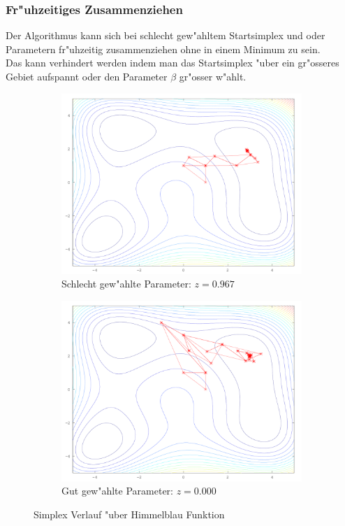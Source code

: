 \subsubsection{Fr"uhzeitiges Zusammenziehen}
\label{sec:downhillZusammenziehen}
Der Algorithmus kann sich bei schlecht gew"ahltem Startsimplex und oder Parametern fr"uhzeitig zusammenziehen ohne in einem Minimum zu sein.\\
Das kann verhindert werden indem man das Startsimplex "uber ein gr"osseres Gebiet aufspannt oder den Parameter $\beta$ gr"osser w"ahlt.


\begin{figure}[htb]
\centering
\begin{subfigure}[b]{0.49\textwidth}
\centering
\includegraphics[width=\textwidth]{downhill/himmelblaubad.png}
\caption{Schlecht gew"ahlte Parameter: $z=0.967$}
\end{subfigure} \begin{subfigure}[b]{0.49\textwidth}
\centering
\includegraphics[width=\textwidth]{downhill/himmelblaugood.png}
\caption{Gut gew"ahlte Parameter: $z=0.000$}
\end{subfigure}

\caption{Simplex Verlauf "uber Himmelblau Funktion}
\label{fig:downhillHimmelblau}
\end{figure}
